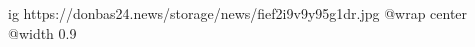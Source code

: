  
 
 
 
 

\ifcmt
  ig https://donbas24.news/storage/news/fief2i9v9y95g1dr.jpg
  @wrap center
  @width 0.9
\fi
